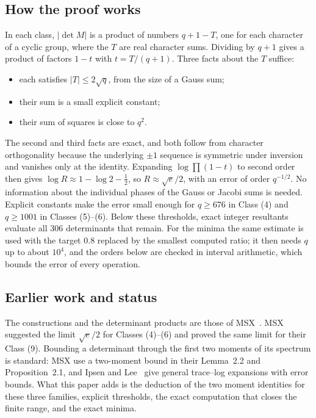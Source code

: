 \documentclass[11pt]{article}
\newcommand{\abs}[1]{\lvert#1\rvert}
\begin{document}
\subsection{How the proof works}
In each class, $\abs{\det M}$ is a product of numbers $q+1-T$, one for
each character of a cyclic group, where the $T$ are real character sums.
Dividing by $q+1$ gives a product of factors $1-t$ with $t=T/(q+1)$.
Three facts about the $T$ suffice:
\begin{itemize}
\item each satisfies $\abs T\le2\sqrt q$, from the size of a Gauss sum;
\item their sum is a small explicit constant;
\item their sum of squares is close to $q^2$.
\end{itemize}
The second and third facts are exact, and both follow from character
orthogonality because the underlying $\pm1$ sequence is symmetric under
inversion and vanishes only at the identity. Expanding
$\log\prod(1-t)$ to second order then gives $\log R\approx 1-\log2-\tfrac12$,
so $R\approx\sqrt e/2$, with an error of order $q^{-1/2}$. No information
about the individual phases of the Gauss or Jacobi sums is needed.
Explicit constants make the error small enough for $q\ge676$ in Class (4)
and $q\ge1001$ in Classes (5)--(6). Below these thresholds, exact integer
resultants evaluate all 306 determinants that remain. For the minima the
same estimate is used with the target $0.8$ replaced by the smallest
computed ratio; it then needs $q$ up to about $10^4$, and the orders below
are checked in interval arithmetic, which bounds the error of every
operation.

\subsection{Earlier work and status}
The constructions and the determinant products are those of
MSX~\cite[Theorem 1.6, Propositions 2.5, 2.6, 2.8, 3.5 and 4.2]{MSX}.
MSX suggested the limit $\sqrt e/2$ for Classes (4)--(6) and proved the
same limit for their Class (9). Bounding a determinant through the first
two moments of its spectrum is standard: MSX use a two-moment bound in
their Lemma~2.2 and Proposition~2.1, and Ipsen and Lee~\cite[Theorem 2.6]{IL}
give general trace--log expansions with error bounds. What this paper adds
is the deduction of the two moment identities for these three families,
explicit thresholds, the exact computation that closes the finite
range, and the exact minima.
\end{document}
